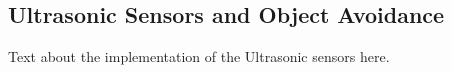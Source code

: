 \documentclass[../report.tex]{subfiles}
\begin{document}
\subsection{Ultrasonic Sensors and Object Avoidance}
Text about the implementation of the Ultrasonic sensors here.
\end{document}
